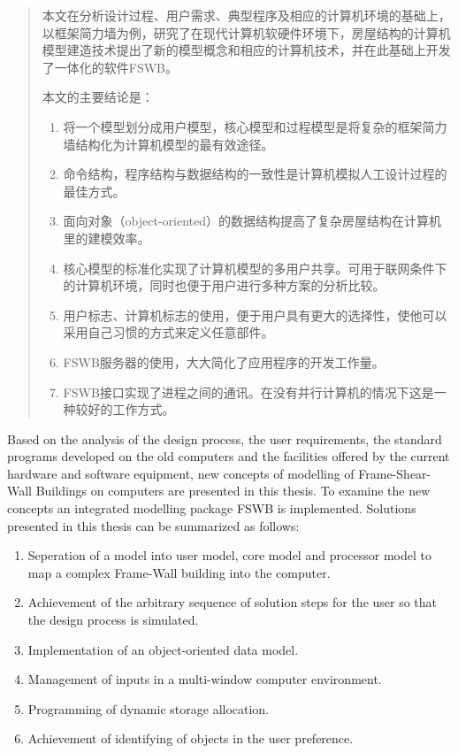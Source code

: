 \documentclass[degree=postdoc]{thuthesis}
\begin{document}
\START
\showoutput

\frontmatter

\begin{abstract}
  本文在分析设计过程、用户需求、典型程序及相应的计算机环境的基础上，以框架简力墙为例，研究了在现代计算机软硬件环境下，房屋结构的计算机模型建造技术提出了新的模型概念和相应的计算机技术，并在此基础上开发了一体化的软件FSWB。

  本文的主要结论是：
  \begin{enumerate}
    \item 将一个模型划分成用户模型，核心模型和过程模型是将复杂的框架简力墙结构化为计算机模型的最有效途径。
    \item 命令结构，程序结构与数据结构的一致性是计算机模拟人工设计过程的最佳方式。
    \item 面向对象（object-oriented）的数据结构提高了复杂房屋结构在计算机里的建模效率。
    \item 核心模型的标准化实现了计算机模型的多用户共享。可用于联网条件下的计算机环境，同时也便于用户进行多种方案的分析比较。
    \item 用户标志、计算机标志的使用，便于用户具有更大的选择性，使他可以采用自己习惯的方式来定义任意部件。
    \item FSWB服务器的使用，大大简化了应用程序的开发工作量。
    \item FSWB接口实现了进程之间的通讯。在没有并行计算机的情况下这是一种较好的工作方式。
  \end{enumerate}

\end{abstract}

\begin{abstract*}
  Based on the analysis of the design process, the user requirements, the standard programs developed on the old computers and the facilities offered by the current hardware and software equipment, new concepts of modelling of Frame-Shear-Wall Buildings on computers are presented in this thesis.
  To examine the new concepts an integrated modelling package FSWB is implemented.
  Solutions presented in this thesis can be summarized as follows:
  \begin{enumerate}
    \item Seperation of a model into user model, core model and processor model to map a complex Frame-Wall building into the computer.
    \item Achievement of the arbitrary sequence of solution steps for the user so that the design process is simulated.
    \item Implementation of an object-oriented data model.
    \item Management of inputs in a multi-window computer environment.
    \item Programming of dynamic storage allocation.
    \item Achievement of identifying of objects in the user preference.
  \end{enumerate}

\end{abstract*}
\end{document}
